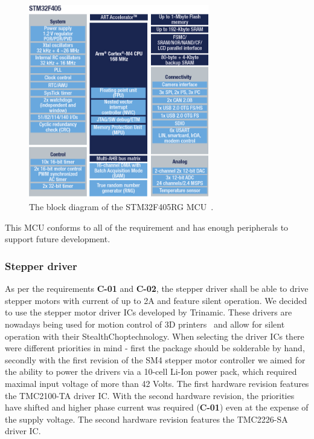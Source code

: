 \begin{figure}[H]
    \centering
    \includegraphics[width=0.7\textwidth]{obrazky/stm32f405_block_diagram}
    \caption{The block diagram of the STM32F405RG MCU~\cite{stmicro_enbd_stm32f405_1mbjpg_nodate}.}
    \label{fig:stm32f405_block_diagram}
\end{figure}

This MCU conforms to all of the requirement and has enough peripherals to support future development.

\subsubsection{Stepper driver}
\label{subsubsec:stepper_driver}
As per the requirements \textbf{C-01} and \textbf{C-02}, the stepper driver shall be able to drive stepper motors with current of up to 2A and feature silent operation.
We decided to use the stepper motor driver ICs developed by Trinamic.
These drivers are nowadays being used for motion control of 3D printers~\cite{josef_prusa_original_2017, josef_prusa_original_2019} and allow for silent operation with their StealthChop\texttrademark technology.
When selecting the driver ICs there were different priorities in mind - first the package should be solderable by hand, secondly with the first revision of the SM4 stepper motor controller we aimed for the ability to power the drivers via a 10-cell Li-Ion power pack, which required maximal input voltage of more than 42 Volts.
The first hardware revision features the TMC2100-TA driver IC.
With the second hardware revision, the priorities have shifted and higher phase current was required (\textbf{C-01}) even at the expense of the supply voltage.
The second hardware revision features the TMC2226-SA driver IC.

